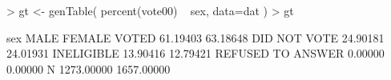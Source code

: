 \begin{Schunk}
\begin{Sinput}
> gt <- genTable( percent(vote00) ~ sex, data=dat )
> gt
\end{Sinput}
\begin{Soutput}
                   sex
                          MALE     FEMALE
  VOTED               61.19403   63.18648
  DID NOT VOTE        24.90181   24.01931
  INELIGIBLE          13.90416   12.79421
  REFUSED TO ANSWER    0.00000    0.00000
  N                 1273.00000 1657.00000
\end{Soutput}
\end{Schunk}
